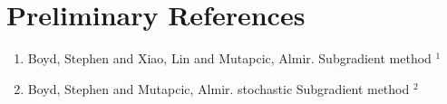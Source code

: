 \documentclass[twoside,twocolumn]{article}
\begin{document}
    











% 
% 

\section{Preliminary References}
\begin{enumerate}
    \item Boyd, Stephen and Xiao, Lin and Mutapcic, Almir. Subgradient method \href{https://info.usherbrooke.ca/jpdussault/ROP771H17/subgrad_method_notes.pdf}{$^1$}
    \item Boyd, Stephen and Mutapcic, Almir. stochastic Subgradient method \href{https://web.stanford.edu/class/ee364b/lectures/stoch_subgrad_notes.pdf}{$^2$}
\end{enumerate}
\end{document}
